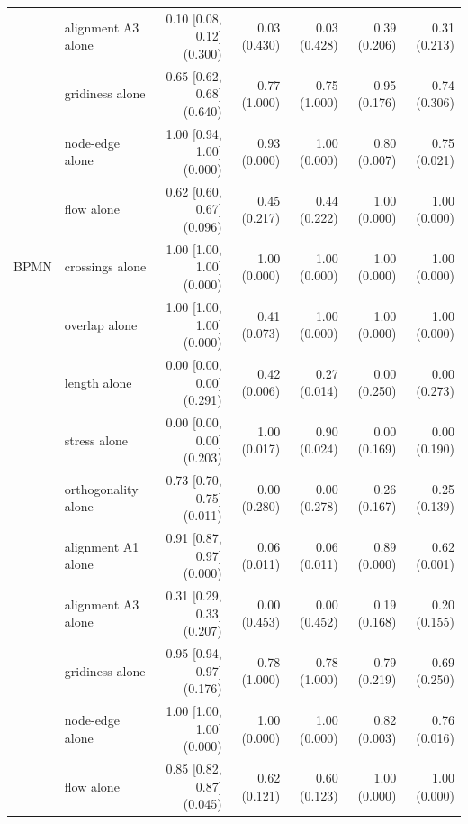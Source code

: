 \documentclass[11pt]{article}
\begin{document}
\begin{center}
\begin{tabular}{llrrrrr}
& alignment A3 alone & 0.10 [0.08, 0.12] (0.300) & 0.03 (0.430) & 0.03 (0.428) & 0.39 (0.206) & 0.31 (0.213) \\
& gridiness alone & 0.65 [0.62, 0.68] (0.640) & 0.77 (1.000) & 0.75 (1.000) & 0.95 (0.176) & 0.74 (0.306) \\
& node-edge alone & 1.00 [0.94, 1.00] (0.000) & 0.93 (0.000) & 1.00 (0.000) & 0.80 (0.007) & 0.75 (0.021) \\
& flow alone & 0.62 [0.60, 0.67] (0.096) & 0.45 (0.217) & 0.44 (0.222) & 1.00 (0.000) & 1.00 (0.000) \\
\midrule
BPMN & crossings alone & 1.00 [1.00, 1.00] (0.000) & 1.00 (0.000) & 1.00 (0.000) & 1.00 (0.000) & 1.00 (0.000) \\
& overlap alone & 1.00 [1.00, 1.00] (0.000) & 0.41 (0.073) & 1.00 (0.000) & 1.00 (0.000) & 1.00 (0.000) \\
& length alone & 0.00 [0.00, 0.00] (0.291) & 0.42 (0.006) & 0.27 (0.014) & 0.00 (0.250) & 0.00 (0.273) \\
& stress alone & 0.00 [0.00, 0.00] (0.203) & 1.00 (0.017) & 0.90 (0.024) & 0.00 (0.169) & 0.00 (0.190) \\
& orthogonality alone & 0.73 [0.70, 0.75] (0.011) & 0.00 (0.280) & 0.00 (0.278) & 0.26 (0.167) & 0.25 (0.139) \\
& alignment A1 alone & 0.91 [0.87, 0.97] (0.000) & 0.06 (0.011) & 0.06 (0.011) & 0.89 (0.000) & 0.62 (0.001) \\
& alignment A3 alone & 0.31 [0.29, 0.33] (0.207) & 0.00 (0.453) & 0.00 (0.452) & 0.19 (0.168) & 0.20 (0.155) \\
& gridiness alone & 0.95 [0.94, 0.97] (0.176) & 0.78 (1.000) & 0.78 (1.000) & 0.79 (0.219) & 0.69 (0.250) \\
& node-edge alone & 1.00 [1.00, 1.00] (0.000) & 1.00 (0.000) & 1.00 (0.000) & 0.82 (0.003) & 0.76 (0.016) \\
& flow alone & 0.85 [0.82, 0.87] (0.045) & 0.62 (0.121) & 0.60 (0.123) & 1.00 (0.000) & 1.00 (0.000) \\
\bottomrule
\end{tabular}
\end{center}
\end{document}
